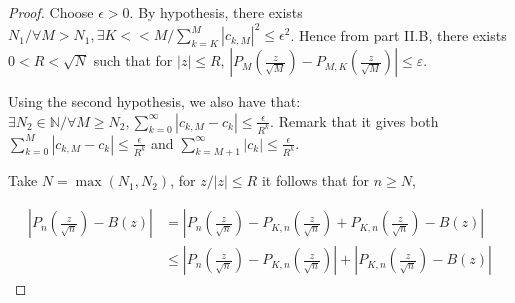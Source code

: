 \documentclass[aps,prl,showpacs,twocolumn]{revtex4-2}
\begin{document}
\begin{proof}
Choose $\epsilon >0$.
By hypothesis, there exists $N_1/\forall M>N_1, \exists K<<M / \sum_{k=K}^{M} |c_{k,M} |^2 \leq \epsilon^2$. Hence from part II.B, there exists $0 < R< \sqrt{N}$ such that for $|z| \leq R$, $\left| P_M \left( \frac{z}{\sqrt{M}} \right) - P_{M,K} \left( \frac{z}{\sqrt{M}} \right) \right| \leq \varepsilon.$

Using the second hypothesis, we also have that: $\exists N_2\in \mathbb{N}/ \forall M\geq N_2,\sum_{k=0}^\infty |c_{k,M}-c_k|\leq \frac{\epsilon}{R^k}$. Remark that it gives both $\sum_{k=0}^M |c_{k,M}-c_k|\leq \frac{\epsilon}{R^k}$ and $\sum_{k=M+1}^\infty |c_k|\leq \frac{\epsilon}{R^k}$.

Take $N=\max(N_1, N_2)$, for $z/ |z|\leq R$ it follows that for $n\geq N$,

\begin{align*}
 \left|P_n\left(\frac{z}{\sqrt{n}}\right)-B\left(z\right)\right| &=  \left|P_n\left(\frac{z}{\sqrt{n}}\right)-P_{K,n}\left(\frac{z}{\sqrt{n}}\right)  + P_{K,n}\left(\frac{z}{\sqrt{n}}\right)-B\left(z\right)\right|\\
    &\leq \left|P_n\left(\frac{z}{\sqrt{n}}\right)-P_{K,n}\left(\frac{z}{\sqrt{n}}\right)\right| + \left|P_{K,n}\left(\frac{z}{\sqrt{n}}\right)-B\left(z\right)\right|
\end{align*}


\end{proof}
\end{document}
